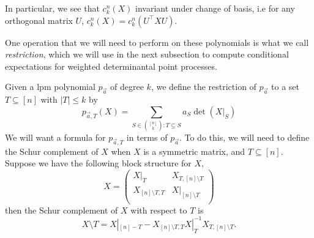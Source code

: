 \documentclass{amsart}
\theoremstyle{definition}
\numberwithin{equation}{section}
\begin{document}
In particular, we see that $c_k^n(X)$ invariant under change of basis, i.e for any orthogonal matrix $U$, $c_k^n(X) = c_k^n(U^{\intercal}XU)$.

One operation that we will need to perform on these polynomials is what we call \emph{restriction}, which we will use in the next subsection to compute conditional expectations for weighted determinantal point processes.

Given a lpm polynomial $p_{\vec{a}}$ of degree $k$, we define the restriction of $p_{\vec{a}}$ to a set $T \subseteq [n]$ with $|T| \le k$ by
\[
    p_{\vec{a}, T}(X) = \sum_{S \in \binom{[n]}{k} : T \subseteq S} a_S \det(X|_S)
\]
We will want a formula for $p_{\vec{a}, T}$ in terms of $p_{\vec{a}}$.
To do this, we will need to define the Schur complement of $X$ when $X$ is a symmetric matrix, and $T \subseteq [n]$.
Suppose we have the following block structure for $X$,
\[
    X = 
    \begin{pmatrix}
        X|_T & X_{T, [n] \setminus T}\\
        X_{[n] \setminus T, T} & X|_{[n] \setminus T}\\
    \end{pmatrix}
\]
then the Schur complement of $X$ with respect to $T$ is
\[
    X \setminus T = X|_{[n]  - T} -  X_{[n] \setminus T, T} X|_{T}^{-1}X_{T, [n] \setminus T}.
\]
\end{document}
